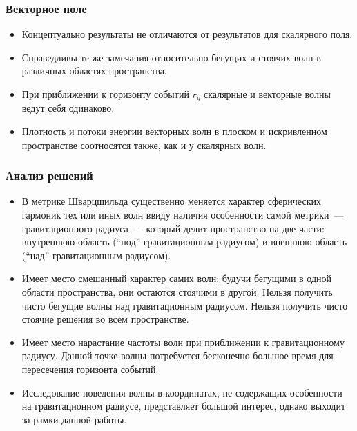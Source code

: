 \documentclass[compress, 9pt]{beamer}
\begin{document}
    \begin{frame}\frametitle{Векторное поле}

        \begin{itemize}\justifying
            \item Концептуально результаты не отличаются от результатов для скалярного поля.
            \item Справедливы те же замечания относительно бегущих и стоячих волн в различных областях пространства.
            \item При приближении к горизонту событий $r_g$ скалярные и векторные волны ведут себя одинаково.
            \item Плотность и потоки энергии векторных волн в плоском и искривленном пространстве соотносятся также, как и у скалярных волн.
        \end{itemize}

    \end{frame}

    \begin{frame}\frametitle{Анализ решений}

        \begin{itemize}\justifying
            \item В метрике Шварцшильда существенно меняется характер сферических гармоник тех или иных волн ввиду наличия особенности самой метрики~--- гравитационного радиуса~--- который делит пространство на две части: внутреннюю область (\enquote{под} гравитационным радиусом) и внешнюю область (\enquote{над} гравитационным радиусом).
            \item  Имеет место смешанный характер самих волн: будучи бегущими в одной области пространства, они остаются стоячими в другой. Нельзя получить чисто бегущие волны над гравитационным радиусом. Нельзя получить чисто стоячие решения во всем пространстве.
            \item  Имеет место нарастание частоты волн при приближении к гравитационному радиусу. Данной точке волны потребуется бесконечно большое время для пересечения горизонта событий.
            \item Исследование поведения волны в координатах, не содержащих особенности на гравитационном радиусе, представляет большой интерес, однако выходит за рамки данной работы.
        \end{itemize}

    \end{frame}
\end{document}
